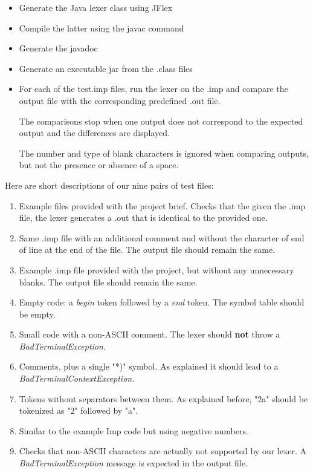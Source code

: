 \documentclass[12pt]{report}
\begin{document}
\begin{itemize}
\item Generate the Java lexer class using JFlex
\item Compile the latter using the javac command
\item Generate the javadoc
\item Generate an executable jar from the .class files
\item For each of the test.imp files, run the lexer on the .imp and compare the output file with the corresponding predefined .out file.

  The comparisons stop when one output does not correspond to the expected output and the differences are displayed.

  The number and type of blank characters is ignored when comparing outputs, but not the presence or absence of a space.
\end{itemize}

Here are short descriptions of our nine pairs of test files:

\begin{enumerate}
\item Example files provided with the project brief. Checks that the given the .imp file, the lexer generates a .out that is identical to the provided one.
\item Same .imp file with an additional comment and without the character of end of line at the end of the file.
  The output file should remain the same.
\item Example .imp file provided with the project, but without any unnecessary blanks.
  The output file should remain the same.
\item Empty code: a \textit{begin} token followed by a \textit{end} token. The symbol table should be empty.
\item Small code with a non-ASCII comment. The lexer should \textbf{not} throw a \textit{BadTerminalException}.
\item Comments, plus a single "*)" symbol. As explained it should lead to a \textit{BadTerminalContextException}.
\item Tokens without separators between them. As explained before, "2a" should be tokenized as "2" followed by "a".
\item Similar to the example Imp code but using negative numbers.
\item Checks that non-ASCII characters are actually not supported by our lexer. A \textit{BadTerminalException} message is expected in the output file.
\end{enumerate}
\end{document}
